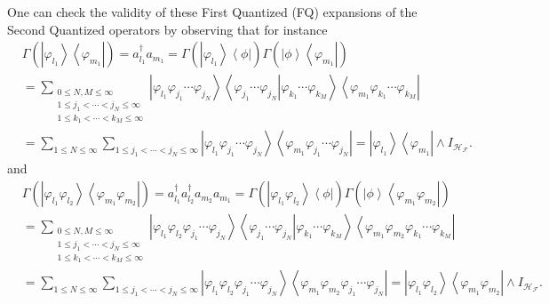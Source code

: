 \documentclass[aps,preprint]{revtex4}%
\begin{document}
One can check the validity of these First Quantized (FQ) expansions of the
Second Quantized operators by observing that for instance%
\begin{align}
&  \Gamma\left(  \left\vert \varphi_{l_{1}}\right\rangle \left\langle
\varphi_{m_{1}}\right\vert \right)  =a_{l_{1}}^{\dagger}a_{m_{1}}%
=\Gamma\left(  \left\vert \varphi_{l_{1}}\right\rangle \left\langle
\phi\right\vert \right)  \Gamma\left(  \left\vert \phi\right\rangle
\left\langle \varphi_{m_{1}}\right\vert \right) \nonumber\\
&  =\sum_{\substack{0\leq N,M\leq\infty\\1\leq j_{1}<\cdots<j_{N}\leq
\infty\\1\leq k_{1}<\cdots<k_{M}\leq\infty}}\left\vert \varphi_{l_{1}}%
\varphi_{j_{1}}\cdots\varphi_{j_{N}}\right\rangle \left\langle \left.
\varphi_{j_{1}}\cdots\varphi_{j_{N}}\right\vert \varphi_{k_{1}}\cdots
\varphi_{k_{M}}\right\rangle \left\langle \varphi_{m_{1}}\varphi_{k_{1}}%
\cdots\varphi_{k_{M}}\right\vert \nonumber\\
&  =\sum_{1\leq N\leq\infty}\sum_{1\leq j_{1}<\cdots<j_{N}\leq\infty
}\left\vert \varphi_{l_{1}}\varphi_{j_{1}}\cdots\varphi_{j_{N}}\right\rangle
\left\langle \varphi_{m_{1}}\varphi_{j_{1}}\cdots\varphi_{j_{N}}\right\vert
=\left\vert \varphi_{l_{1}}\right\rangle \left\langle \varphi_{m_{1}%
}\right\vert \wedge I_{\mathcal{H}_{\mathcal{F}}}.
\end{align}
and%
\begin{align}
&  \Gamma\left(  \left\vert \varphi_{l_{1}}\varphi_{l_{2}}\right\rangle
\left\langle \varphi_{m_{1}}\varphi_{m_{2}}\right\vert \right)  =a_{l_{1}%
}^{\dagger}a_{l_{2}}^{\dagger}a_{m_{2}}a_{m_{1}}=\Gamma\left(  \left\vert
\varphi_{l_{1}}\varphi_{l_{2}}\right\rangle \left\langle \phi\right\vert
\right)  \Gamma\left(  \left\vert \phi\right\rangle \left\langle
\varphi_{m_{1}}\varphi_{m_{2}}\right\vert \right) \nonumber\\
&  =\sum_{\substack{0\leq N,M\leq\infty\\1\leq j_{1}<\cdots<j_{N}\leq
\infty\\1\leq k_{1}<\cdots<k_{M}\leq\infty}}\left\vert \varphi_{l_{1}}%
\varphi_{l_{2}}\varphi_{j_{1}}\cdots\varphi_{j_{N}}\right\rangle \left\langle
\left.  \varphi_{j_{1}}\cdots\varphi_{j_{N}}\right\vert \varphi_{k_{1}}%
\cdots\varphi_{k_{M}}\right\rangle \left\langle \varphi_{m_{1}}\varphi_{m_{2}%
}\varphi_{k_{1}}\cdots\varphi_{k_{M}}\right\vert \nonumber\\
&  =\sum_{1\leq N\leq\infty}\sum_{1\leq j_{1}<\cdots<j_{N}\leq\infty
}\left\vert \varphi_{l_{1}}\varphi_{l_{2}}\varphi_{j_{1}}\cdots\varphi_{j_{N}%
}\right\rangle \left\langle \varphi_{m_{1}}\varphi_{m_{2}}\varphi_{j_{1}%
}\cdots\varphi_{j_{N}}\right\vert =\left\vert \varphi_{l_{1}}\varphi_{l_{2}%
}\right\rangle \left\langle \varphi_{m_{1}}\varphi_{m_{2}}\right\vert \wedge
I_{\mathcal{H}_{\mathcal{F}}}.
\end{align}
\end{document}
